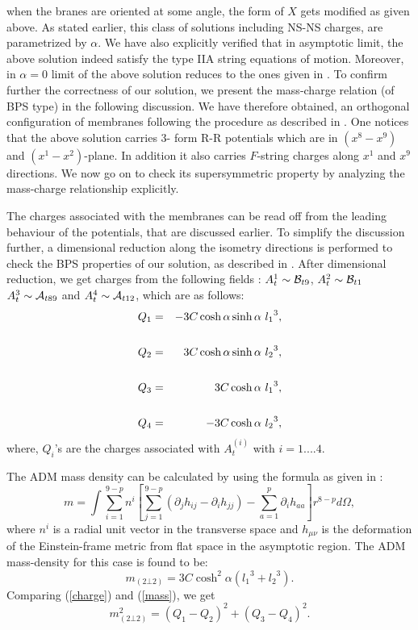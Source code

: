 \documentclass[a4paper,12pt,fleqn,cite,epsfig]{article}
\begin{document}
when the branes are oriented at some angle, the form of $X$ gets
modified as given above. As stated earlier, this class
of solutions including NS-NS charges, are parametrized by $\alpha$. 
We have also explicitly verified that in asymptotic limit, 
the above solution indeed
satisfy the type IIA string equations of motion. Moreover, in
$\alpha=0$ limit of the above solution reduces 
to the ones given in \cite{tseyt,hambli}. To confirm further the 
correctness of our solution, we present the mass-charge relation 
(of BPS type) in the following discussion. We have therefore obtained,
an orthogonal configuration of membranes following the procedure as
described in \cite{myers}. One notices that the above solution carries 
3- form R-R potentials which are in $(x^8-x^9)$ and
$(x^1-x^2)$-plane. In addition it
also carries $F$-string charges along $x^1$ and $x^9$ directions.  
We now go on to check its supersymmetric
property by analyzing the mass-charge relationship explicitly.  

The charges associated with the membranes can be
read off from the leading behaviour of the potentials, that are
discussed earlier. To simplify the discussion further, a dimensional reduction 
along the isometry directions is performed to check the BPS properties of
our solution, as described in \cite{roy,kamal}. After dimensional 
reduction, we get charges from the following fields : 
$A^1_t \sim {\cal{B}}_{t 9}$, 
$A^2_t \sim {\cal{B}}_{t 1}$
$A^3_t \sim {\cal{A}}_{t 8 9}$ and $A^4_t \sim {\cal{A}}_{t 1 2}$,
which are as follows:
\begin{eqnarray}
Q_1 &=&  -3C\cosh\alpha\sinh\alpha~{l_1}^3,\cr
& \cr
Q_2 &=& 3C\cosh\alpha\sinh\alpha~{l_2}^3, \cr
& \cr
Q_3 &=& 3C\cosh\alpha~{l_1}^3, \cr
& \cr
Q_4 &=& -3C\cosh\alpha~{l_2}^3,
\label{charge} 
\end{eqnarray}
where, $Q_i$'s are the charges associated with $A_t^{(i)}$ with $i=
1....4$. 

The ADM mass density can be calculated by using the formula as given in
\cite{lu,myers}:
\begin{equation}
m = \int \sum_{i=1}^{9-p} n^i
\left[\sum_{j=1}^{9-p} (\partial_j h_{i j} - \partial_i h_{j j}  )
 - \sum_{a=1}^p \partial_i h_{aa} \right] r^{8 - p} d\Omega,
\label{adm-mass}
\end{equation}
where $n^i$ is a radial unit vector in the transverse space and 
$h_{\mu \nu}$ is the deformation of the Einstein-frame metric
from flat space in the asymptotic region.  
The ADM mass-density for this case is found to be:
\begin{equation}
m_{(2\bot 2)} = 3C \cosh^2 \alpha({l_1}^3 + {l_2}^3). 
\label{mass}
\end{equation}
Comparing (\ref{charge}) and (\ref{mass}), we get
\begin{equation}
m_{(2 \bot 2)}^{2} = (Q_1 - Q_2)^2 + (Q_3 - Q_4)^2.
\label{mass-charge}
\end{equation}
\end{document}
